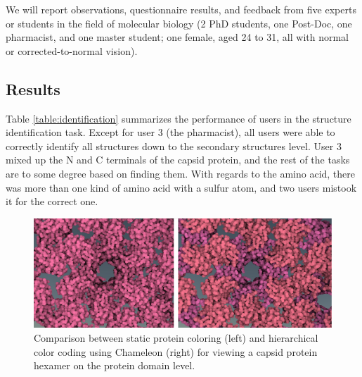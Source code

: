 \documentclass{egpubl}
\begin{document}
	
	We will report observations, questionnaire results, and feedback from five experts or students in the field of molecular biology (2 PhD students, one Post-Doc, one pharmacist, and one master student; one female, aged 24 to 31, all with normal or corrected-to-normal vision). 
	
	\subsection{Results}
	
	Table \ref{table:identification} summarizes the performance of users in the structure identification task. 
	Except for user 3 (the pharmacist), all users were able to correctly identify all structures down to the secondary structures level. 
	User 3 mixed up the N and C terminals of the capsid protein, and the rest of the tasks are to some degree based on finding them.
	With regards to the amino acid, there was more than one kind of amino acid with a sulfur atom, and two users mistook it for the correct one.
	
	
	
	\begin{figure}
		\centering
		\includegraphics[width=1\linewidth]{Figures/comparison}
		\caption{Comparison between static protein coloring (left) and hierarchical color coding using Chameleon (right) for viewing a capsid protein hexamer on the protein domain level. }
		\label{fig:comparison}
	\end{figure}
	
	
	
\end{document}
